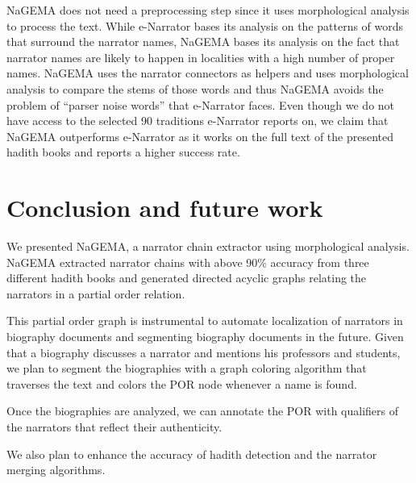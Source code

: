 \documentclass[11pt]{article}
\begin{document}
NaGEMA does not need a preprocessing step since 
it uses morphological analysis to process the text. 
While e-Narrator bases its analysis on the patterns 
of words that surround the narrator names, 
NaGEMA bases its analysis on the fact that narrator
names are likely to happen in localities with a high
number of proper names. 
NaGEMA uses the narrator connectors as helpers and
uses morphological analysis to compare the stems of
those words and thus NaGEMA avoids the problem of 
``parser noise words'' that e-Narrator faces. 
Even though we do not have access to the selected
90 traditions e-Narrator reports on, we claim
that NaGEMA outperforms e-Narrator as it works on
the full text of the presented hadith books
and reports a higher success rate. 

\section{Conclusion and future work}
\label{sec:future}

We presented NaGEMA, a narrator chain extractor
using morphological analysis. 
NaGEMA extracted narrator chains with above 90\% accuracy
from three different hadith books and generated 
directed acyclic graphs relating the narrators 
in a partial order relation. 

This partial order graph is instrumental to automate
localization of narrators in biography documents and
segmenting biography documents in the future.
Given that a biography discusses a narrator 
and mentions his professors and students,
we plan to segment the biographies with a graph 
coloring algorithm
that traverses the text and colors the POR node whenever
a name is found. 

Once the biographies are analyzed, we can annotate
the POR with qualifiers of the narrators that reflect
their authenticity. 

We also plan to 
enhance the accuracy of hadith detection and the 
narrator merging algorithms. 

\end{document}
